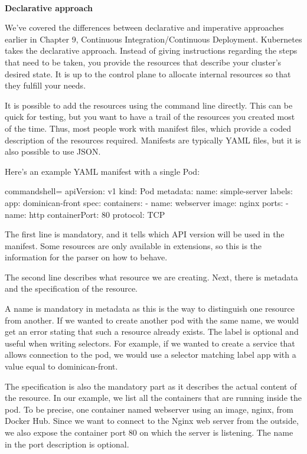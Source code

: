 \hspace*{\fill} \\ %
\noindent
\textbf{Declarative approach}

We've covered the differences between declarative and imperative approaches earlier in Chapter 9, Continuous Integration/Continuous Deployment. Kubernetes takes the  declarative approach. Instead of giving instructions regarding the steps that need to be taken, you provide the resources that describe your cluster's desired state. It is up to the control plane to allocate internal resources so that they fulfill your needs.

It is possible to add the resources using the command line directly. This can be quick for testing, but you want to have a trail of the resources you created most of the time. Thus, most people work with manifest files, which provide a coded description of the resources required. Manifests are typically YAML files, but it is also possible to use JSON.

Here's an example YAML manifest with a single Pod:

\begin{tcblisting}{commandshell={}}
apiVersion: v1
kind: Pod
metadata:
  name: simple-server
  labels:
    app: dominican-front
spec:
  containers:
    - name: webserver
      image: nginx
      ports:
        - name: http
          containerPort: 80
          protocol: TCP
\end{tcblisting}

The first line is mandatory, and it tells which API version will be used in the manifest. Some resources are only available in extensions, so this is the information for the parser on how to behave. 

The second line describes what resource we are creating. Next, there is metadata and the specification of the resource.

A name is mandatory in metadata as this is the way to distinguish one resource from another. If we wanted to create another pod with the same name, we would get an error stating that such a resource already exists. The label is optional and useful when writing selectors. For example, if we wanted to create a service that allows connection to the pod, we would use a selector matching label app with a value equal to dominican-front.

The specification is also the mandatory part as it describes the actual content of the resource. In our example, we list all the containers that are running inside the pod. To be precise, one container named webserver using an image, nginx, from Docker Hub. Since we want to connect to the Nginx web server from the outside, we also expose the container port 80 on which the server is listening. The name in the port description is optional.

